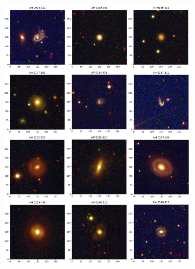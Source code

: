 \begin{anexosenv}
    \begin{figure}[h]
        \centering 
        \includegraphics[width=0.9\textwidth]{Imagens/imagem_02.png} 
        \caption[]{}
        \label{fig:imagem_02} 
    \end{figure}


\end{anexosenv}
